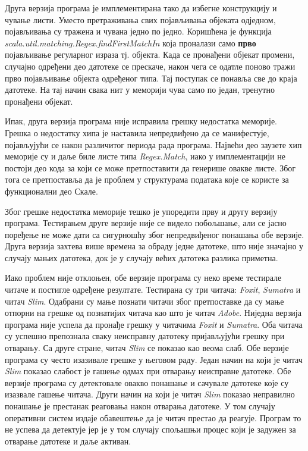 \documentclass[12pt,oneside]{memoir}
\begin{document}
Друга верзија програма је имплементирана тако да избегне конструкцију и чување листи. Уместо претраживања свих појављивања објеката одједном, појављивања су тражена и чувана једно по једно. Коришћена је функција \textit{scala.util.matching.Regex.findFirstMatchIn} која проналази само \textbf{прво} појављивање регуларног израза тј. објекта. Када се пронађени објекат промени, случајно одређени део датотеке се прескаче, након чега се одатле поново тражи прво појављивање објекта одређеног типа. Тај поступак се понавља све до краја датотеке. На тај начин свака нит у меморији чува само по један, тренутно пронађени објекат.

Ипак, друга верзија програма није исправила грешку недостатка меморије. Грешка о недостатку хипа је наставила непредвиђено да се манифестује, појављујући се након различитог периода рада програма. Највећи део заузете хип меморије су и даље биле листе типа \textit{Regex.Match}, иако у имплементацији не постоји део кода за који се може претпоставити да генерише овакве листе. Због тога се претпоставља да је проблем у структурама података које се користе за функционални део Скале.

Због грешке недостатка меморије тешко је упоредити прву и другу верзију програма. Тестирањем друге верзије није се видело побољшање, али се јасно поређење не може дати са сигурношћу због непредвиђеног понашања обе верзије. Друга верзија захтева више времена за обраду једне датотеке, што није значајно у случају мањих датотека, док је у случају већих датотека разлика приметна.

Иако проблем није отклоњен, обе верзије програма су неко време тестирале читаче и постигле одређене резултате. Тестирана су три читача: \textit{Foxit}, \textit{Sumatra} и читач \textit{Slim}. Одабрани су мање познати читачи због претпоставке да су мање отпорни на грешке од познатијих читача као што је читач  \textit{Adobe}. Ниједна верзија програма није успела да пронађе грешку у читачима \textit{Foxit} и \textit{Sumatra}. Оба читача су успешно препознала сваку неисправну датотеку пријављујући грешку при отварању. Са друге стране, читач \textit{Slim} се показао као веома слаб. Обе верзије програма су често изазивале грешке у његовом раду. Један начин на који је читач \textit{Slim} показао слабост је гашење одмах при отварању неисправне датотеке. Обе верзије програма су детектовале овакво понашање и сачувале датотеке које су изазвале гашење читача. Други начин на који је читач \textit{Slim} показао неправилно понашање је престанак реаговања након отварања датотеке. У том случају оперативни систем издаје обавештење да је читач престао да реагује. Програм то не успева да детектује јер је у том случају спољашњи процес који је задужен за отварање датотеке и даље активан.
\end{document}
